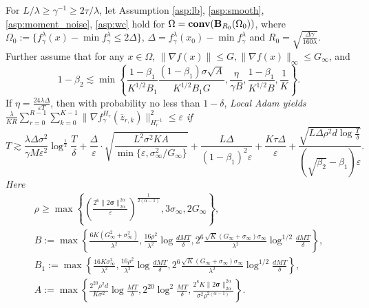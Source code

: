 \documentclass{article} %
\numberwithin{equation}{section}
\begin{document}
\begin{thm}\label{app:thm:local_adam}
    For $L/\lambda\geq \gamma^{-1}\geq 2\tau/\lambda$, let Assumption \ref{asp:lb}, \ref{asp:smooth}, \ref{asp:moment_noise}, \ref{asp:wc} hold for $\Omega=\mbox{\bf conv}(\mbox{\bf B}_{R_0}(\Omega_0))$, where $\Omega_0:=\{f_{\gamma}^\lambda(x) - \min f_\gamma^\lambda\leq 2\Delta\}$, $\Delta=f_{\gamma}^\lambda(x_0)-\min f_\gamma^\lambda$ and $R_0=\sqrt{\frac{\Delta\gamma}{160\lambda}}$. 
    Further assume that for any $x\in \Omega$, $\|\nabla f(x)\|\leq G, \|\nabla f(x)\|_{\infty}\leq G_{\infty}$, and
    \begin{equation}
        1-\beta_2 \lesssim \min\left\{\frac{1-\beta_1}{K^{1/2}B_1}\frac{(1-\beta_1)\sigma\sqrt{A}}{K^{1/2}B_1G}, \frac{\eta}{\gamma B}, \frac{1-\beta_1}{K^{1/2}B}, \frac{1}{K}\right\}.
    \end{equation}
    If $\eta=\frac{24\lambda\Delta}{\varepsilon T}$, then with probability no less than $1-\delta$, \em Local \em Adam yields $\frac{\lambda}{KR}\sum_{r=0}^{R-1}\sum_{k=0}^{K-1}\|\nabla f_\gamma^{H_r}(\overline{z}_{r,k}) \|_{H_r^{-1}}^2 \leq \varepsilon$ if  
    \begin{equation}\label{app:eq:T_bound_local_adam}
        T\gtrsim \frac{\lambda\Delta\sigma^2}{\gamma M\varepsilon^2}\log^{\frac{1}{2}}\frac{T}{\delta} + \frac{\Delta}{\varepsilon}\cdot \sqrt{\frac{L^2\sigma^2KA}{\min\{\varepsilon, \sigma_\infty^2/G_\infty\}}} + \frac{L\Delta}{(1-\beta_1)^{2}\varepsilon} + \frac{K\tau\Delta}{\varepsilon} + \frac{\sqrt{L\Delta\rho^2d\log\frac{T}{\delta}}}{(\sqrt{\beta_2}-\beta_1)\varepsilon}.
    \end{equation}
    Here
    \begin{equation}\label{eq:hyperpara}
        \begin{array}{l}
            \rho\geq \max\left\{ \left(\frac{2^6\|2\boldsymbol{\sigma}\|_{2\alpha}^{2\alpha}}{\varepsilon}\right)^{\frac{1}{2(\alpha-1)}}, 3\sigma_\infty, 2G_{\infty}\right\}, \\
            B:= \max\left\{\frac{6K(G_\infty^2+\sigma_\infty^2)}{\lambda^2}, \frac{16\rho^2}{\lambda^2}\log\frac{dMT}{\delta}, 2^6\frac{\sqrt{K}(G_\infty+\sigma_\infty)\sigma_\infty}{\lambda^2}\log^{1/2}\frac{dMT}{\delta}\right\}, \\
            B_1:=\max\left\{\frac{16K\sigma_\infty^2}{\lambda^2}, \frac{16\rho^2}{\lambda^2}\log\frac{dMT}{\delta}, 2^6\frac{\sqrt{K}(G_\infty+\sigma_\infty)\sigma_\infty}{\lambda^2}\log^{1/2}\frac{dMT}{\delta}\right\}, \\
            A:=\max\left\{\frac{2^{20}\rho^2d}{K\sigma^2}\log\frac{MT}{\delta}, 2^{20}\log^2\frac{MT}{\delta}, \frac{2^8K\|2\boldsymbol{\sigma}\|_{2\alpha}^{2\alpha}}{\sigma^2\rho^{2(\alpha-1)}} \right\}.
        \end{array}
    \end{equation}
\end{thm}
\end{document}
